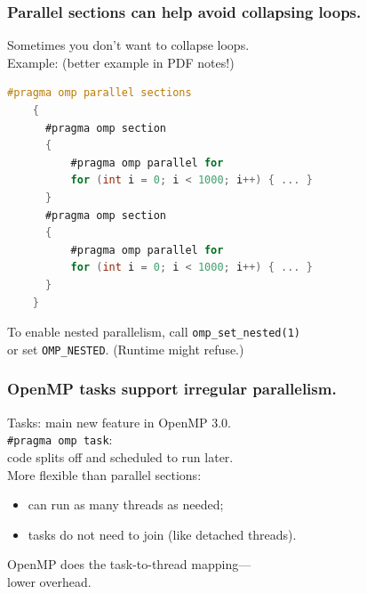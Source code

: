 \begin{frame}[fragile]
  \frametitle{Parallel sections can help avoid collapsing loops.}
  

  \begin{changemargin}{2cm}
  Sometimes you don't want to collapse loops.\\[1em]

  Example: (better example in PDF notes!)\\[1em]

{\small
  \begin{lstlisting}[language=C,morekeywords={foreach,pragma,omp,parallel,single,nowait,task,untied,barrier,taskyield}]
    #pragma omp parallel sections
    {
      #pragma omp section
      { 
          #pragma omp parallel for
          for (int i = 0; i < 1000; i++) { ... } 
      }
      #pragma omp section
      {
          #pragma omp parallel for
          for (int i = 0; i < 1000; i++) { ... } 
      }
    }
\end{lstlisting}}

  To enable nested parallelism, call \verb+omp_set_nested(1)+\\ or
  set \verb+OMP_NESTED+. (Runtime might refuse.)\\[1em]

  \end{changemargin}
  


\end{frame}

\begin{frame}[fragile]
  \frametitle{OpenMP tasks support irregular parallelism.}

  \begin{changemargin}{1cm}
\large
  Tasks: main new feature in OpenMP 3.0.\\[1em]

  \verb+#pragma omp task+:\\ \qquad code splits off and scheduled to run later.\\[1em]

  More flexible than parallel sections: 
\vspace*{-1em}
  \begin{itemize}
   \item can run as many threads as needed;
   \item tasks do not need to join (like detached threads).
  \end{itemize}
  OpenMP does the task-to-thread mapping---\\ lower overhead.
  \end{changemargin}
  


\end{frame}

